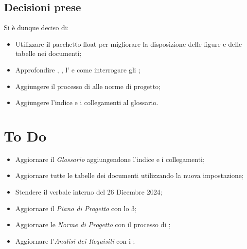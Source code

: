 \documentclass[a4paper, 12pt]{article}
\begin{document}
\subsection{Decisioni prese}
Si è dunque deciso di:
\begin{itemize}
    \item Utilizzare il pacchetto float per migliorare la disposizione delle figure e delle tabelle nei documenti;
    \item Approfondire , , l' e come interrogare gli ;
    \item Aggiungere il processo di  alle norme di progetto;
    \item Aggiungere l'indice e i collegamenti al glossario.
\end{itemize}
\section{To Do}
\begin{itemize}
    \item Aggiornare il \textit{Glossario} aggiungendone l'indice e i collegamenti;
    \item Aggiornare tutte le tabelle dei documenti utilizzando la nuova impostazione;
    \item Stendere il verbale interno del 26 Dicembre 2024;
    \item Aggiornare il \textit{Piano di Progetto} con lo  3;
    \item Aggiornare le \textit{Norme di Progetto} con il processo di ;
    \item Aggiornare l'\textit{Analisi dei Requisiti} con i ;
\end{itemize}
\end{document}
